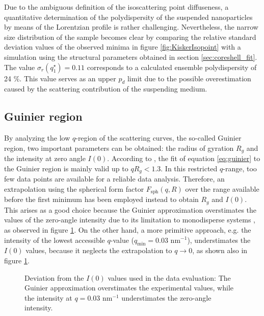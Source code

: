 Due to the ambiguous definition of the isoscattering point diffuseness, a quantitative determination of the polydispersity of the suspended nanoparticles by means of the Lorentzian profile is rather challenging. Nevertheless, the narrow size distribution of the sample becomes clear by comparing the relative standard deviation values of the observed minima in figure \ref{fig:KiskerIsopoint} with a simulation using the structural parameters obtained in section \ref{sec:coreshell_fit}. The value \( \sigma_r(q^{\star}_1)=0.11 \) corresponds to a calculated ensemble polydispersity of 24 $\%$. This value serves as an upper \( p_d \) limit due to the possible overestimation caused by the scattering contribution of the suspending medium.


\subsection{Guinier region}
\label{sec:guinier_analysis}
By analyzing the low \(q \)-region of the scattering curves, the so-called Guinier region, two important parameters can be obtained: the radius of gyration \(R_g\) and the intensity at zero angle \(I(0)\). According to \cite{feigin_structure_1987}, the fit of equation \eqref{eq:guinier} to the Guinier region is mainly valid up to \( qR_g<1.3 \). In this restricted \(q\)-range, too few data points are available for a reliable data analysis. Therefore, an extrapolation using the spherical form factor \( F_{\text{sph}}(q,R) \) over the range available before the first minimum has been employed instead to obtain \(R_g\) and \(I(0)\). This arises as a good choice because the Guinier approximation overstimates the values of the zero-angle intensity due to its limitation to monodisperse systems \citep{feigin_structure_1987}, as observed in figure \ref{fig:KiskerIntensityComparison}. On the other hand, a more primitive approach, e.g. the intensity of the lowest accessible $q$-value ($q_{\text{min}}=0.03$ nm$^{-1}$), understimates the $I(0)$ values, because it neglects the extrapolation to $q\rightarrow0$, as shown also in figure \ref{fig:KiskerIntensityComparison}.

\begin{figure}%
	\centering
		
		\caption[Deviation from the $I(0)$ used in the evaluation of the PS-COOH data.]{Deviation from the $I(0)$ values used in the data evaluation: The Guinier approximation overstimates the experimental values, while the intensity at $q=0.03$ nm$^{-1}$ understimates the zero-angle intensity.}
		\label{fig:KiskerIntensityComparison}
\end{figure}

